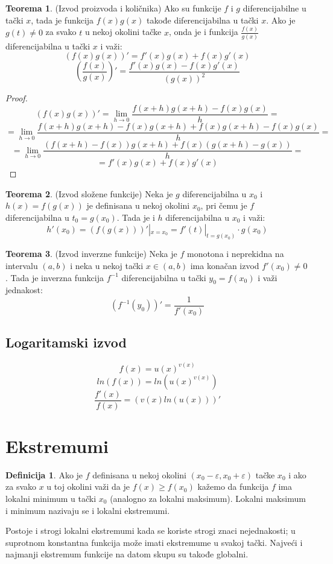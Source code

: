 \documentclass{article}
\theoremstyle{definition}
\newtheorem{definition}{Definicija}[section]
\newtheorem{theorem}{Teorema}[section]
\begin{document}
        \begin{theorem}
            (Izvod proizvoda i količnika) Ako su funkcije $f$ i $g$ diferencijabilne u tački $x$, tada je funkcija $f(x)g(x)$ takođe diferencijabilna u tački $x$. Ako je $g(t) \neq 0$ za svako $t$ u nekoj okolini tačke $x$, onda je i funkcija $\frac{f(x)}{g(x)}$ diferencijabilna u tački $x$ i važi:
            $$(f(x)g(x))' = f'(x)g(x) + f(x)g'(x)$$
            $$\left(\frac{f(x)}{g(x)}\right)' = \frac{f'(x)g(x) - f(x)g'(x)}{(g(x))^2}$$
        \end{theorem}
        \begin{proof}
            $$(f(x)g(x))' = \lim_{h \to 0} \frac{f(x + h)g(x + h) - f(x)g(x)}{h} =$$
            $$= \lim_{h \to 0} \frac{f(x + h)g(x + h) - f(x)g(x + h) + f(x)g(x + h) - f(x)g(x)}{h} =$$
            $$= \lim_{h \to 0} \frac{(f(x + h) - f(x))g(x + h) + f(x)(g(x + h) - g(x))}{h} =$$
            $$= f'(x)g(x) + f(x)g'(x)$$
        \end{proof}

        \begin{theorem}
            (Izvod složene funkcije) Neka je $g$ diferencijabilna u $x_0$ i $h(x) = f(g(x))$ je definisana u nekoj okolini $x_0$, pri čemu je $f$ diferencijabilna u $t_0 = g(x_0)$. Tada je i $h$ diferencijabilna u $x_0$ i važi:
            $$h'(x_0) = (f(g(x)))'|_{x = x_0} = f'(t)|_{t = g(x_0)} \cdot g(x_0)$$
        \end{theorem}

        \begin{theorem}
            (Izvod inverzne funkcije) Neka je $f$ monotona i neprekidna na intervalu $(a, b)$ i neka u nekoj tački $x \in (a, b)$ ima konačan izvod $f'(x_0) \neq 0$. Tada je inverzna funkcija $f^{-1}$ diferencijabilna u tački $y_0 = f(x_0)$ i važi jednakost:
            $$(f^{-1}(y_0))' = \frac{1}{f'(x_0)}$$
        \end{theorem}

        \subsection{Logaritamski izvod}
            $$f(x) = u(x)^{v(x)}$$
            $$ln(f(x)) = ln(u(x)^{v(x)})$$
            $$\frac{f'(x)}{f(x)} = (v(x)ln(u(x)))'$$

    \section{Ekstremumi}
        \begin{definition}
            Ako je $f$ definisana u nekoj okolini $(x_0 - \varepsilon, x_0 + \varepsilon)$ tačke $x_0$ i ako za svako $x$ u toj okolini važi da je $f(x) \geq f(x_0)$ kažemo da funkcija $f$ ima lokalni minimum u tački $x_0$ (analogno za lokalni maksimum). Lokalni maksimum i minimum nazivaju se i lokalni ekstremumi.
    
            Postoje i strogi lokalni ekstremumi kada se koriste strogi znaci nejednakosti; u suprotnom konstantna funkcija može imati ekstremume u svakoj tački. Najveći i najmanji ekstremum funkcije na datom skupu su takođe globalni.
        \end{definition}
\end{document}
